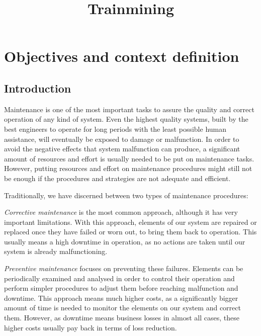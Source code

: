 \documentclass[a4paper,10pt]{report}
\title{Trainmining}
\author{}
\begin{document}
\newcommand\litem[1]{\item{\bfseries #1 }}
\renewcommand{\abstractname}{Executive Summary}
\begin{abstract}

\end{abstract}


\maketitle


\chapter{Objectives and context definition}
\section{Introduction}\label{sec:context}
Maintenance is one of the most important tasks to assure the quality and correct operation of any kind of system. Even the highest quality systems, built by the best engineers to operate for long periods with the least possible human assistance, will eventually be exposed to damage or malfunction. In order to avoid the negative effects that system malfunction can produce, a significant amount of resources and effort is usually needed to be put on maintenance tasks. However, putting resources and effort on maintenance procedures might still not be enough if the procedures and strategies are not adequate and efficient.

Traditionally, we have discerned between two types of maintenance procedures:

\emph{Corrective maintenance} is the most common approach, although it has very important limitations. With this approach, elements of our system are repaired or replaced once they have failed or worn out, to bring them back to operation. This usually means a high downtime in operation, as no actions are taken until our system is already malfunctioning.

\emph{Preventive maintenance} focuses on preventing these failures. Elements can be periodically examined and analysed in order to control their operation and perform simpler procedures to adjust them before reaching malfunction and downtime. This approach means much higher costs, as a significantly bigger amount of time is needed to monitor the elements on our system and correct them. However, as downtime means business losses in almost all cases, these higher costs usually pay back in terms of loss reduction.
\end{document}
